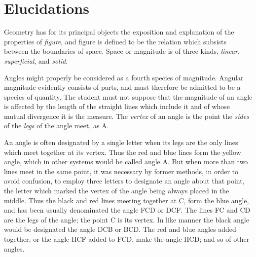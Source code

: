 \chapter*{Elucidations}

Geometry has for its principal objects the exposition and explanation of the properties of \emph{figure}, and figure is defined to be the relation which subsists between the boundaries of space. Space or magnitude is of three kinds, \emph{linear}, \emph{superficial}, and \emph{solid}.

\drawCurrentPictureInMargin
Angles might properly be considered as a fourth species of magnitude. Angular magnitude evidently consists of parts, and must therefore be admitted to be a species of quantity. The student must not suppose that the magnitude of an angle is affected by the length of the straight lines which include it and of whose mutual divergence it is the measure. The \emph{vertex} of an angle is the point the \emph{sides} of the \emph{legs} of the angle meet, as A.

\drawCurrentPictureInMargin
An angle is often designated by a single letter when its legs are the only lines which meet together at its vertex. Thus the red and blue lines form the yellow angle, which in other systems would be called angle A. But when more than two lines meet in the same point, it was necessary by former methods, in order to avoid confusion, to employ three letters to designate an angle about that point, the letter which marked the vertex of the angle being always placed in the middle. Thus the black and red lines meeting together at C, form the blue angle, and has been usually denominated the angle FCD or DCF. The lines FC and CD are the legs of the angle; the point C is its vertex. In like manner the black angle would be designated the angle DCB or BCD. The red and blue angles added together, or the angle HCF added to FCD, make the angle HCD; and so of other angles.

